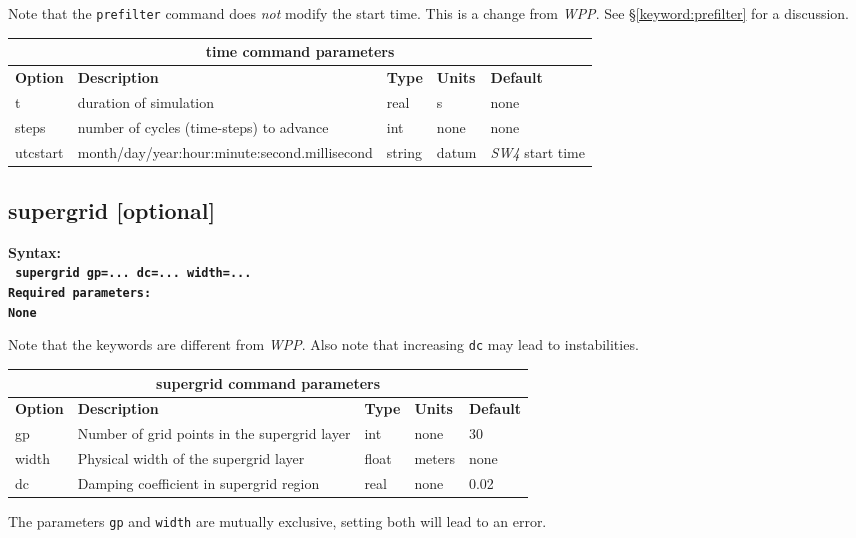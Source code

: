 \documentclass[11pt]{report}
\begin{document}
Note that the \verb+prefilter+ command does {\it not} modify the start time. This is a change from
\emph{WPP}. See \S\ref{keyword:prefilter} for a discussion.
%
\begin{center}
\begin{tabular}{|l|p{8cm}|l|l|l|} \hline
\multicolumn{5}{|c|}{\bf time command parameters}\\ \hline
{\bf Option} & {\bf Description} & {\bf Type} & {\bf Units} & {\bf Default} \\ \hline \hline
t & duration of simulation & real & s	& none \\ \hline
steps & number of cycles (time-steps) to advance & int & none & none\\ \hline
utcstart & month/day/year:hour:minute:second.millisecond & string & datum & {\emph{SW4} start time}\\ \hline
\end{tabular}
\end{center}

\subsection{supergrid [optional]} 
\label{keyword:supergrid}
\begin{flushleft}\bf
Syntax:\\
\tt
supergrid gp=... dc=... width=...
\\
\bf Required parameters:\\
\rm
None
\end{flushleft}
Note that the keywords are different from \emph{WPP}. Also note that
increasing {\tt dc} may lead to instabilities.
\begin{center}
\begin{tabular}{|l|p{10cm}|l|l|l|} \hline
\multicolumn{5}{|c|}{\bf supergrid command parameters}\\ \hline
\bf{Option} & \bf{Description} & \bf{Type} &{\bf Units} & \bf{Default} \\ \hline \hline
%
gp &  Number of grid points in the supergrid layer & int & none & 30\\ \hline
width &  Physical width of the supergrid layer & float & meters & none \\ \hline
%
dc & Damping coefficient in supergrid region & real & none & 0.02 \\ \hline
\end{tabular}
\end{center}
The parameters {\tt gp} and {\tt width} are mutually exclusive, setting both will lead to an error. 
\end{document}

